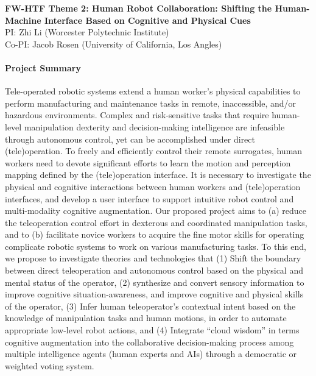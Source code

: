 \pagebreak

\begin{center}
	{\Large \bf FW-HTF Theme 2: \textbf{Human Robot Collaboration: Shifting the Human-Machine Interface Based on Cognitive and Physical Cues}}\\
    \vspace{4pt}
   	{\large PI: Zhi Li (Worcester Polytechnic Institute)\\
    Co-PI: Jacob Rosen (University of California, Los Angles)}
\end{center}

\vspace{1 em}

\paragraph*{\Large Project Summary} 
Tele-operated robotic systems extend a human worker's physical capabilities to perform manufacturing and maintenance tasks in remote, inaccessible, and/or hazardous environments. Complex and risk-sensitive tasks that require human-level manipulation dexterity and decision-making intelligence are infeasible through autonomous control, yet can be accomplished under direct (tele)operation. To freely and efficiently control their remote surrogates, human workers need to devote significant efforts to learn the motion and perception mapping defined by the (tele)operation interface. It is necessary to investigate the physical and cognitive interactions between human workers and (tele)operation interfaces, and develop a user interface to support intuitive robot control and multi-modality cognitive augmentation. Our proposed project aims to (a) reduce the teleoperation control effort in dexterous and coordinated manipulation tasks, and to (b) facilitate novice workers to acquire the fine motor skills for operating complicate robotic systems to work on various manufacturing tasks. To this end, we propose to investigate theories and technologies that (1) Shift the boundary between direct teleoperation and autonomous control based on the physical and mental status of the operator, (2) synthesize and convert sensory information to improve cognitive situation-awareness, and improve cognitive and physical skills of the operator, (3) Infer human teleoperator's contextual intent based on the knowledge of manipulation tasks and human motions, in order to automate appropriate low-level robot actions, and (4) Integrate ``cloud wisdom'' in terms cognitive augmentation into the collaborative decision-making process among multiple intelligence agents (human experts and AIs) through a democratic or weighted voting system.

